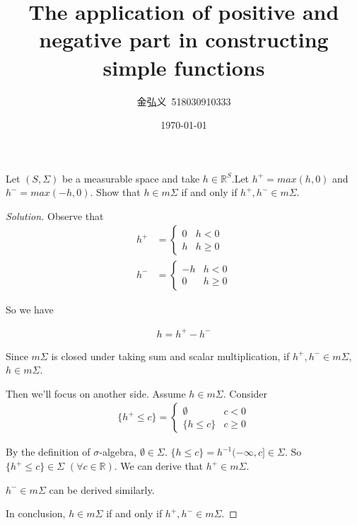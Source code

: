 \documentclass[a4paper, linespread=1.5]{article}
\begin{document}
    \title{ The application of positive and negative part in constructing simple functions }
    \author{金弘义\ 518030910333}
    \date{\today}
    \maketitle
    
    \begin{customex}{9}
    	Let $(S,\Sigma)$ be a measurable space and take $h\in \mathbb{R}^{S} $.Let $h^{+}=max(h,0)$ and $h^{-}=max(-h,0)$. Show that $h\in m\Sigma$ if and only if $h^{+},h^{-}\in m\Sigma$.
        
    \end{customex}
	\begin{proof}[Solution]
		
		Observe that \begin{align*}
			h^{+}&=\begin{cases}
			0&h<0 \\
			h&h\ge 0
			\end{cases}\\
			h^{-}&=\begin{cases}
			-h& h<0\\
			0 & h\ge 0
			\end{cases}
		\end{align*}
		
		So we have
		 
		\begin{align*}
		h=h^{+}-h^{-}
		\end{align*}
		
		Since $m\Sigma$ is closed under taking sum and scalar multiplication, if $h^{+},h^{-}\in m\Sigma$, $h\in m\Sigma$. 
		
		Then we'll focus on another side. Assume $h\in m\Sigma$. Consider
		\begin{align*}
			\{h^{+}\le c\}=\begin{cases}
			\emptyset & c<0 \\
			\{h\le c\} & c\ge 0
			\end{cases}
		\end{align*}
		
		By the definition of $\sigma$-algebra, $\emptyset \in \Sigma$. $\{h\le c\}=h^{-1}(-\infty,c] \in \Sigma$. So $\{h^{+}\le c\}\in \Sigma$ $(\forall c\in \mathbb{R})$. We can derive that $h^{+}\in m\Sigma$.
		
		 $h^{-} \in m\Sigma$ can be derived similarly.
		
		In conclusion, $h\in m\Sigma$ if and only if $h^{+},h^{-}\in m\Sigma$.
	\end{proof}
\end{document}
